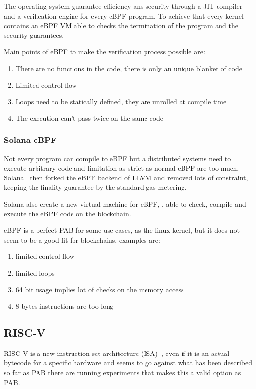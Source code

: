 \documentclass[../main.tex]{subfiles}
\begin{document}
The operating system guarantee efficiency ans security through a JIT compiler and a verification engine for every eBPF program. To achieve that every kernel contains an eBPF VM able to checks the termination of the program and the security guarantees.

Main points of eBPF to make the verification process possible are:
\begin{enumerate}
  \item There are no functions in the code, there is only an unique blanket of code
  \item Limited control flow
  \item Loops need to be statically defined, they are unrolled at compile time
  \item The execution can't pass twice on the same code
\end{enumerate}

\subsubsection{Solana eBPF}

Not every program can compile to eBPF but a distributed systems need to execute arbitrary code and limitation as strict as normal eBPF are too much, Solana~\cite{yakovenko2018solana} then forked the eBPF backend of LLVM and removed lots of constraint, keeping the finality guarantee by the standard gas metering.~\cite{ebpf-contracts}

Solana also create a new virtual machine for eBPF, \href{https://github.com/qmonnet/rbpf}, able to check, compile and execute the eBPF code on the blockchain.

eBPF is a perfect PAB for some use cases, as the linux kernel, but it does not seem to be a good fit for blockchains, examples are:
\begin{enumerate}
  \item limited control flow
  \item limited loops
  \item 64 bit usage implies lot of checks on the memory access
  \item 8 bytes instructions are too long
\end{enumerate}

\subsection{RISC-V}

RISC-V is a new instruction-set architecture (ISA)~\cite{risc-v-spec}, even if it is an actual bytecode for a specific hardware and seems to go against what has been described so far as PAB there are running experiments that makes this a valid option as PAB.
\end{document}
